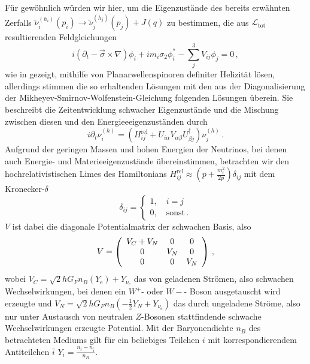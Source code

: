 Für gewöhnlich würden wir hier, um die Eigenzustände des bereits erwähnten Zerfalls $\tilde{\nu}^{(h_i)}_i (p_i) \rightarrow \tilde{\nu}^{(h_j)}_j (p_j) + J(q)$ zu bestimmen, 
die aus $\mathcal{L}_\text{tot}$ resultierenden Feldgleichungen 
\begin{equation}
    i \left(\partial_t - \vec{\sigma} \times \nabla \right) \phi_i + i m_i \sigma_2 \phi^*_i - \sum^3_j V_{i j} \phi_j = 0 \,,
\end{equation}
wie in \cite{komponentendinger} gezeigt, mithilfe von Planarwellenspinoren definiter Helizität lösen, 
allerdings stimmen die so erhaltenden Lösungen mit den aus der Diagonalisierung der Mikheyev-Smirnov-Wolfenstein-Gleichung folgenden Lösungen überein.
Sie beschreibt die Zeitentwicklung schwacher Eigenzustände und die Mischung zwischen diesen und den Energieeeigenzuständen durch
\begin{equation}
    i \partial_t \nu^{(h)}_i = \left(H^\text{rel}_{i j} + U_{i \alpha} V_{\alpha \beta} U^\dagger_{\beta j}\right) \nu^{(h)}_j \,.
    \label{eq:MSW-gleichung}
\end{equation}
Aufgrund der geringen Massen und hohen Energien der Neutrinos, bei denen auch Energie- und Materieeigenzustände übereinstimmen, betrachten wir den hochrelativistischen Limes des Hamiltonians $H^\text{rel}_{i j} \approx \left(p + \frac{m^2_i}{2 p}\right) \delta_{ij}$ mit dem Kronecker-$\delta$
\begin{equation}
    \delta_{ij} = \begin{cases}
                    1, \quad i=j \\
                    0, \quad \text{sonst} \,.
                  \end{cases}
                  \label{eq:kronecker}
\end{equation}
$V$ ist dabei die diagonale Potentialmatrix der schwachen Basis, also
\begin{equation}
    V = \left( \begin{array}{c c c}
        V_C + V_N   &   0     &     0   \\ 
        0           &   V_N   &     0   \\ 
        0           &   0     &     V_N  \\
        \end{array}\right) \,,
\end{equation}
wobei $V_C = \sqrt{2} h G_F n_B (Y_\text{e}) + Y_{\nu_\text{e}}$ das von geladenen Strömen, also schwachen Wechselwirkungen, bei denen ein $W^+$- oder $W-$- Boson ausgetauscht wird erzeugte und 
$V_N = \sqrt{2} h G_F n_B \left(-\frac{1}{2} Y_N + Y_{\nu_\text{e}}\right)$ das durch ungeladene Ströme, also nur unter Austausch von neutralen $Z$-Bosonen stattfindende schwache Wechselwirkungen erzeugte Potential.
Mit der Baryonendichte $n_B$ des betrachteten Mediums gilt für ein beliebiges Teilchen $i$ mit korrespondierendem Antiteilchen $\bar{i}$ $Y_i = \frac{n_i - n_{\bar{i}}}{n_B}$.

